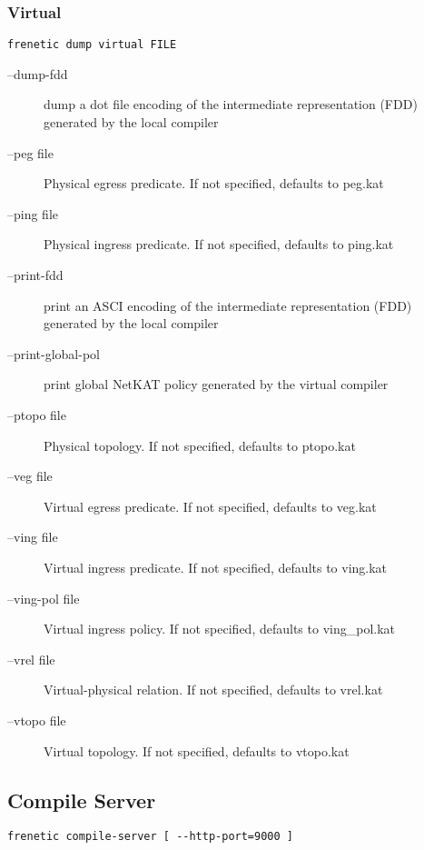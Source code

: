 \subsubsection{Virtual}

\begin{verbatim}
frenetic dump virtual FILE
\end{verbatim}

\begin{description}
\item[--dump-fdd]          dump a dot file encoding of the intermediate
                        representation (FDD) generated by the local compiler
\item[--peg file]          Physical egress predicate. If not specified, defaults to
                        peg.kat
\item[--ping file]         Physical ingress predicate. If not specified, defaults
                        to ping.kat
\item[--print-fdd]         print an ASCI encoding of the intermediate
                        representation (FDD) generated by the local compiler
\item[--print-global-pol]  print global NetKAT policy generated by the virtual
                        compiler
\item[--ptopo file]        Physical topology. If not specified, defaults to
                        ptopo.kat
\item[--veg file]          Virtual egress predicate. If not specified, defaults to
                        veg.kat
\item[--ving file]         Virtual ingress predicate. If not specified, defaults to
                        ving.kat
\item[--ving-pol file]     Virtual ingress policy. If not specified, defaults to
                        ving\_pol.kat
\item[--vrel file]         Virtual-physical relation. If not specified, defaults to
                        vrel.kat
\item[--vtopo file]        Virtual topology. If not specified, defaults to
                        vtopo.kat
\end{description}


\subsection{Compile Server}

\begin{verbatim}
frenetic compile-server [ --http-port=9000 ] 
\end{verbatim}

